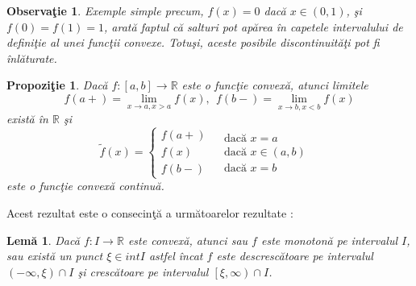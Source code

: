 \documentclass[a4paper,12pt,oneside]{report}
\newtheorem{proposition}{Propozi\c tie}
\newtheorem{remark}{Observa\c{t}ie}
\newtheorem{lemma}{Lem\u{a}}
\begin{document}
 \begin{remark}
	Exemple simple precum, \(f\left ( x \right )= 0\) dac\u{a} \(x\in \left ( 0 , 1 \right )\), \c{s}i  \(f\left ( 0 \right )= f\left ( 1 \right ) = 1\), arat\u{a} faptul c\u{a} salturi  pot ap\u{a}rea \^{i}n capetele intervalului de defini\c{t}ie al unei func\c{t}ii convexe. Totu\c{s}i, aceste posibile discontinuit\u{a}\c{t}i pot fi \^{i}nl\u{a}turate.
\end{remark}


\begin{proposition}
Dac\u{a} \(f: \left [ a, b \right ]\rightarrow \mathbb{R}\) este o func\c{t}ie convex\u{a}, atunci limitele
\[
f\left ( a+ \right ) = \lim_{x\rightarrow a, x> a}f\left ( x \right ),~~ f\left ( b- \right ) = \lim_{x\rightarrow b, x< b}f\left ( x \right )\] exist\u{a} \^{i}n \(\mathbb{R}\) \c{s}i
\begin{displaymath}
  \tilde{f}\left ( x \right )= \left\{\begin{matrix}
f\left ( a+ \right ) & \\
 f\left ( x \right )& \\
 f\left ( b- \right )&
\end{matrix} \begin{matrix}
\text{dac\u{a} } x=a & \\
\text{dac\u{a} } x\in \left ( a,b \right ) & \\
\text{dac\u{a} } x= b&
\end{matrix}\right.
\end{displaymath}
 este o func\c{t}ie convex\u{a} continu\u{a}.
\end{proposition}
	Acest rezultat este o consecin\c{t}\u{a} a urm\u{a}toarelor rezultate :
\begin{lemma}

Dac\u{a} \(f: I \rightarrow \mathbb{R}\) este convex\u{a}, atunci sau \(f\) este monoton\u{a} pe intervalul \(I\), sau exist\u{a} un punct \(\xi \in int I\) astfel \^{i}ncat \(f\) este descresc\u{a}toare pe intervalul \(\left ( -\infty , \xi  \right )\cap I\) \c{s}i cresc\u{a}toare pe intervalul \(\left[\xi , \infty  \right )\cap I\).
\end{lemma}
\end{document}
